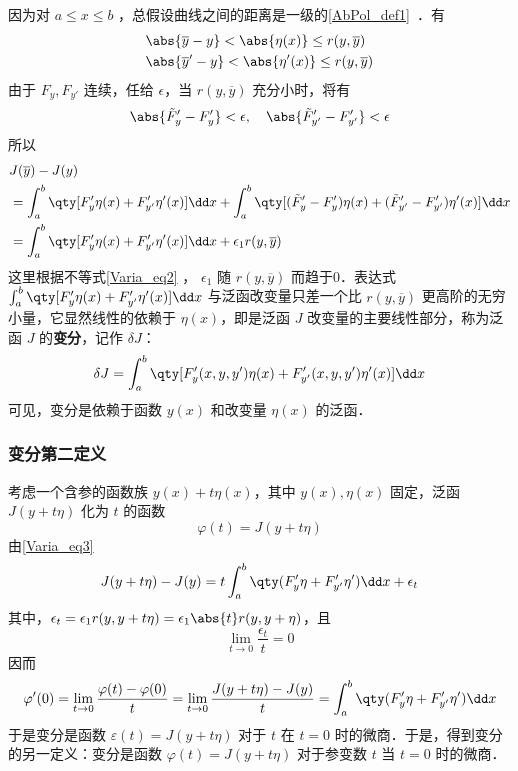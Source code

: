 因为对 $a\leq x\leq b$ ，总假设曲线之间的距离是一级的\autoref{AbPol_def1}~．有
\begin{equation}
\begin{aligned}
&\abs{\overline{y}-y}<\abs{\eta(x)}\leq r(y,\overline{y})\\
&\abs{\overline{y}'-y}<\abs{\eta'(x)}\leq r(y,\overline{y})
\end{aligned}
\end{equation}
由于 $F_y,F_{y'}$ 连续，任给 $\epsilon$，当 $r(y,\overline{y})$ 充分小时，将有
\begin{equation}\label{Varia_eq2}
\abs{\tilde{F}'_y-F'_y}<\epsilon,\quad\abs{\tilde{F}'_{y'}-F'_{y'}}<\epsilon
\end{equation}
所以
\begin{equation}\label{Varia_eq3}
\begin{aligned}
&J(\overline{y})-J(y)\\
&=\int_a^b\qty[F'_y\eta(x)+F'_{y'}\eta'(x)]\dd x+\int_a^b\qty[(\tilde{F}'_y-F'_y)\eta(x)+(\tilde{F}'_{y'}-F'_{y'})\eta'(x)]\dd x\\
&=\int_a^b\qty[F'_y\eta(x)+F'_{y'}\eta'(x)]\dd x+\epsilon_1r(y,\overline{y})
\end{aligned}
\end{equation}
这里根据不等式\autoref{Varia_eq2} ， $\epsilon_1$ 随 $r(y,\overline{y})$ 而趋于0．表达式 $\int_a^b\qty[F'_y\eta(x)+F'_{y'}\eta'(x)]\dd x$ 与泛函改变量只差一个比 $r(y,\overline{y})$ 更高阶的无穷小量，它显然线性的依赖于 $\eta(x)$，即是泛函 $J$ 改变量的主要线性部分，称为泛函 $J$ 的\textbf{变分}，记作 $\delta{J}$：
\begin{equation}\label{Varia_eq4}
\delta J=\int_a^b\qty[F'_y(x,y,y')\eta(x)+F'_{y'}(x,y,y')\eta'(x)]\dd x
\end{equation}
可见，变分是依赖于函数 $y(x)$ 和改变量 $\eta(x)$ 的泛函．
\subsubsection{变分第二定义}
考虑一个含参的函数族 $y(x)+t\eta(x)$，其中 $y(x),\eta(x)$ 固定，泛函 $J(y+t\eta)$ 化为 $t$ 的函数
\begin{equation}
\varphi(t)=J(y+t\eta)
\end{equation}
由\autoref{Varia_eq3} 
\begin{equation}
J(y+t\eta)-J(y)=t\int_a^b\qty(F'_y\eta+F'_{y'}\eta')\dd x+\epsilon_t
\end{equation}
其中，$\epsilon_t=\epsilon_1r(y,y+t\eta)=\epsilon_1\abs{t}r(y,y+\eta)$，且
\begin{equation}
\lim_{t\rightarrow 0}\frac{\epsilon_t}{t}=0
\end{equation}
因而
\begin{equation}
\varphi'(0)=\lim_{t\rightarrow 0}\frac{\varphi(t)-\varphi(0)}{t}=\lim_{t\rightarrow 0}\frac{J(y+t\eta)-J(y)}{t}=\int_a^b\qty(F'_y\eta+F'_{y'}\eta')\dd x
\end{equation}
于是变分是函数 $\varepsilon(t)=J(y+t\eta)$ 对于 $t$ 在 $t=0$ 时的微商．于是，得到变分的另一定义：变分是函数 $\varphi(t)=J(y+t\eta)$ 对于参变数 $t$ 当 $t=0$ 时的微商．
